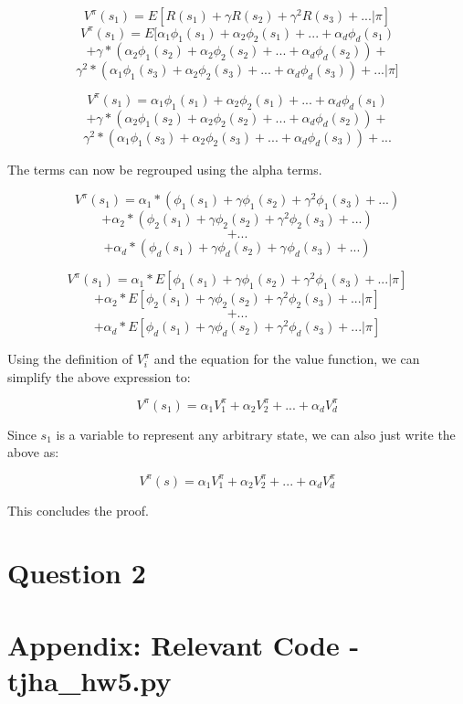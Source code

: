 \documentclass[11pt]{article}
\begin{document}
$$V^{\pi}(s_{1}) = E[R(s_{1}) + \gamma R(s_{2}) + \gamma^{2} R(s_{3}) + ... | \pi]$$
$$V^{\pi}(s_{1}) = E[\alpha_{1}\phi_{1}(s_{1}) + \alpha_{2}\phi_{2}(s_{1}) + ... +  \alpha_{d}\phi_{d}(s_{1})$$
$$ + \gamma * (\alpha_{2}\phi_{1}(s_{2}) + \alpha_{2}\phi_{2}(s_{2}) + ... +  \alpha_{d}\phi_{d}(s_{2})) +$$
$$ \gamma^{2}* (\alpha_{1}\phi_{1}(s_{3}) + \alpha_{2}\phi_{2}(s_{3}) + ... +  \alpha_{d}\phi_{d}(s_{3})) + ... | \pi]$$

$$V^{\pi}(s_{1}) = \alpha_{1}\phi_{1}(s_{1}) + \alpha_{2}\phi_{2}(s_{1}) + ... +  \alpha_{d}\phi_{d}(s_{1})$$
$$ + \gamma * (\alpha_{2}\phi_{1}(s_{2}) + \alpha_{2}\phi_{2}(s_{2}) + ... +  \alpha_{d}\phi_{d}(s_{2})) +$$
$$ \gamma^{2}* (\alpha_{1}\phi_{1}(s_{3}) + \alpha_{2}\phi_{2}(s_{3}) + ... +  \alpha_{d}\phi_{d}(s_{3})) + ... $$

The terms can now be regrouped using the alpha terms.

$$V^{\pi}(s_{1}) = \alpha_{1}*(\phi_{1}(s_{1}) + \gamma \phi_{1}(s_{2}) + \gamma^{2} \phi_{1}(s_{3}) + ... ) $$
$$
+ \alpha_{2}*(\phi_{2}(s_{1}) + \gamma \phi_{2}(s_{2}) + \gamma^{2} \phi_{2}(s_{3}) + ... )$$
$$
+ ... 
$$
$$
+ \alpha_{d}*(\phi_{d}(s_{1}) + \gamma \phi_{d}(s_{2}) + \gamma^{} \phi_{d}(s_{3}) + ... )
$$

$$V^{\pi}(s_{1}) = \alpha_{1}* E[\phi_{1}(s_{1}) + \gamma \phi_{1}(s_{2}) + \gamma^{2} \phi_{1}(s_{3}) + ... | \pi] $$
$$
+ \alpha_{2}*E[\phi_{2}(s_{1}) + \gamma \phi_{2}(s_{2}) + \gamma^{2} \phi_{2}(s_{3}) + ... | \pi]$$
$$
+ ... 
$$
$$
+ \alpha_{d}*E[\phi_{d}(s_{1}) + \gamma \phi_{d}(s_{2}) + \gamma^{2} \phi_{d}(s_{3}) + ... | \pi]
$$

Using the definition of $V_{i}^{\pi}$ and the equation for the value function, we can simplify the above expression to:

$$V^{\pi}(s_{1}) = \alpha_{1} V_{1}^{\pi} + \alpha_{2} V_{2}^{\pi} + ... + \alpha_{d} V_{d}^{\pi}
$$

Since $s_{1}$ is a variable to represent any arbitrary state, we can also just write the above as:

$$V^{\pi}(s) = \alpha_{1} V_{1}^{\pi} + \alpha_{2} V_{2}^{\pi} + ... + \alpha_{d} V_{d}^{\pi}
$$

This concludes the proof.

\section*{Question 2}


\section*{Appendix: Relevant Code - tjha\_hw5.py}
   
\end{document}
